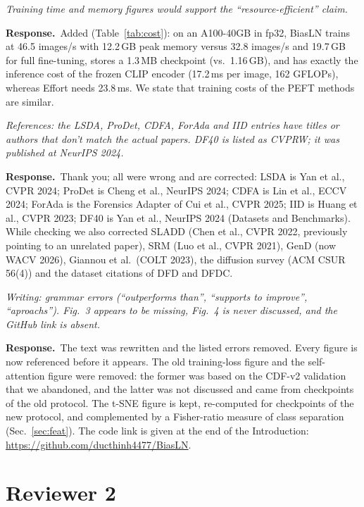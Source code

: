 \documentclass[11pt]{article}
\newenvironment{comment}{\par\medskip\noindent\begin{minipage}{\linewidth}\color{black!70}\itshape}{\end{minipage}\par\smallskip}
\newcommand{\resp}{\noindent\textbf{Response.}~}
\begin{document}
\begin{comment}
Training time and memory figures would support the ``resource-efficient'' claim.
\end{comment}
\resp Added (Table~\ref{tab:cost}): on an A100-40GB in fp32, BiasLN trains at 46.5 images/s with 12.2\,GB peak memory versus 32.8 images/s and 19.7\,GB for full fine-tuning, stores a 1.3\,MB checkpoint (vs.\ 1.16\,GB), and has exactly the inference cost of the frozen CLIP encoder (17.2\,ms per image, 162 GFLOPs), whereas Effort needs 23.8\,ms. We state that training costs of the PEFT methods are similar.

\begin{comment}
References: the LSDA, ProDet, CDFA, ForAda and IID entries have titles or authors that don't match the actual papers. DF40 is listed as CVPRW; it was published at NeurIPS 2024.
\end{comment}
\resp Thank you; all were wrong and are corrected: LSDA is Yan et al., CVPR 2024; ProDet is Cheng et al., NeurIPS 2024; CDFA is Lin et al., ECCV 2024; ForAda is the Forensics Adapter of Cui et al., CVPR 2025; IID is Huang et al., CVPR 2023; DF40 is Yan et al., NeurIPS 2024 (Datasets and Benchmarks). While checking we also corrected SLADD (Chen et al., CVPR 2022, previously pointing to an unrelated paper), SRM (Luo et al., CVPR 2021), GenD (now WACV 2026), Giannou et al.\ (COLT 2023), the diffusion survey (ACM CSUR 56(4)) and the dataset citations of DFD and DFDC.

\begin{comment}
Writing: grammar errors (``outperforms than'', ``supports to improve'', ``aproachs''). Fig.~3 appears to be missing, Fig.~4 is never discussed, and the GitHub link is absent.
\end{comment}
\resp The text was rewritten and the listed errors removed. Every figure is now referenced before it appears. The old training-loss figure and the self-attention figure were removed: the former was based on the CDF-v2 validation that we abandoned, and the latter was not discussed and came from checkpoints of the old protocol. The t-SNE figure is kept, re-computed for checkpoints of the new protocol, and complemented by a Fisher-ratio measure of class separation (Sec.~\ref{sec:feat}). The code link is given at the end of the Introduction: \url{https://github.com/ducthinh4477/BiasLN}.

\section*{Reviewer 2}
\end{document}
